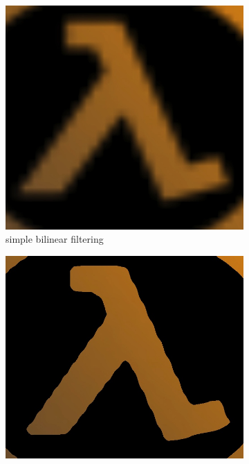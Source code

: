 \begin{figure}\label{f:magnification}
	\begin{subfigure}[t]{0.298\textwidth}
		\includegraphics[width=1.0\textwidth]{graphics/df/magnification}
		\caption{simple bilinear filtering}
	\end{subfigure}
	\begin{subfigure}[t]{.33\textwidth}
		\includegraphics[width=1.0\textwidth]{graphics/df/alpha-testing}

\end{subfigure}
\end{figure}

